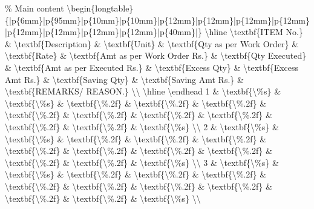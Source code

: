 \% Main content
\textbackslash{}begin\{longtable\}\{|p\{6mm\}|p\{95mm\}|p\{10mm\}|p\{10mm\}|p\{12mm\}|p\{12mm\}|p\{12mm\}|p\{12mm\}|p\{12mm\}|p\{12mm\}|p\{12mm\}|p\{12mm\}|p\{40mm\}|\}
\textbackslash{}hline
\textbackslash{}textbf\{ITEM No.\} \& \textbackslash{}textbf\{Description\} \& \textbackslash{}textbf\{Unit\} \& \textbackslash{}textbf\{Qty as per Work Order\} \& \textbackslash{}textbf\{Rate\} \& \textbackslash{}textbf\{Amt as per Work Order Rs.\} \& \textbackslash{}textbf\{Qty Executed\} \& \textbackslash{}textbf\{Amt as per Executed Rs.\} \& \textbackslash{}textbf\{Excess Qty\} \& \textbackslash{}textbf\{Excess Amt Rs.\} \& \textbackslash{}textbf\{Saving Qty\} \& \textbackslash{}textbf\{Saving Amt Rs.\} \& \textbackslash{}textbf\{REMARKS/ REASON.\} \textbackslash{}\textbackslash{}
\textbackslash{}hline
\textbackslash{}endhead
1 \& \textbackslash{}textbf\{\textbackslash{}\%s\} \& \textbackslash{}textbf\{\textbackslash{}\%s\} \& \textbackslash{}textbf\{\textbackslash{}\%.2f\} \& \textbackslash{}textbf\{\textbackslash{}\%.2f\} \& \textbackslash{}textbf\{\textbackslash{}\%.2f\} \& \textbackslash{}textbf\{\textbackslash{}\%.2f\} \& \textbackslash{}textbf\{\textbackslash{}\%.2f\} \& \textbackslash{}textbf\{\textbackslash{}\%.2f\} \& \textbackslash{}textbf\{\textbackslash{}\%.2f\} \& \textbackslash{}textbf\{\textbackslash{}\%.2f\} \& \textbackslash{}textbf\{\textbackslash{}\%.2f\} \& \textbackslash{}textbf\{\textbackslash{}\%s\} \textbackslash{}\textbackslash{}
2 \& \textbackslash{}textbf\{\textbackslash{}\%s\} \& \textbackslash{}textbf\{\textbackslash{}\%s\} \& \textbackslash{}textbf\{\textbackslash{}\%.2f\} \& \textbackslash{}textbf\{\textbackslash{}\%.2f\} \& \textbackslash{}textbf\{\textbackslash{}\%.2f\} \& \textbackslash{}textbf\{\textbackslash{}\%.2f\} \& \textbackslash{}textbf\{\textbackslash{}\%.2f\} \& \textbackslash{}textbf\{\textbackslash{}\%.2f\} \& \textbackslash{}textbf\{\textbackslash{}\%.2f\} \& \textbackslash{}textbf\{\textbackslash{}\%.2f\} \& \textbackslash{}textbf\{\textbackslash{}\%.2f\} \& \textbackslash{}textbf\{\textbackslash{}\%s\} \textbackslash{}\textbackslash{}
3 \& \textbackslash{}textbf\{\textbackslash{}\%s\} \& \textbackslash{}textbf\{\textbackslash{}\%s\} \& \textbackslash{}textbf\{\textbackslash{}\%.2f\} \& \textbackslash{}textbf\{\textbackslash{}\%.2f\} \& \textbackslash{}textbf\{\textbackslash{}\%.2f\} \& \textbackslash{}textbf\{\textbackslash{}\%.2f\} \& \textbackslash{}textbf\{\textbackslash{}\%.2f\} \& \textbackslash{}textbf\{\textbackslash{}\%.2f\} \& \textbackslash{}textbf\{\textbackslash{}\%.2f\} \& \textbackslash{}textbf\{\textbackslash{}\%.2f\} \& \textbackslash{}textbf\{\textbackslash{}\%.2f\} \& \textbackslash{}textbf\{\textbackslash{}\%s\} \textbackslash{}\textbackslash{}
